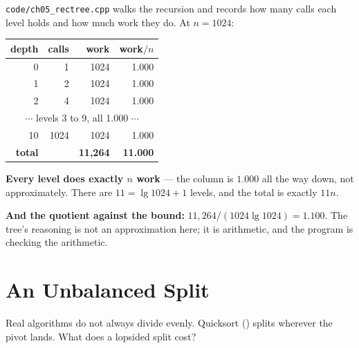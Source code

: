 \begin{worked}
\texttt{code/ch05\_rectree.cpp} walks the recursion and records how many calls
each level holds and how much work they do. At $n = 1024$:

\begin{center}
\begin{tabular}{@{}rrrr@{}}
\toprule
\rowcolor{primary!15}
depth & calls & work & work$/n$ \\
\midrule
0 &    1 & 1024 & 1.000 \\
1 &    2 & 1024 & 1.000 \\
2 &    4 & 1024 & 1.000 \\
\multicolumn{4}{c}{$\cdots$ levels 3 to 9, all 1.000 $\cdots$} \\
10 & 1024 & 1024 & 1.000 \\
\midrule
\textbf{total} & & \textbf{11{,}264} & \textbf{11.000} \\
\bottomrule
\end{tabular}
\end{center}

\smallskip
\textbf{Every level does exactly $n$ work} --- the column is $1.000$ all the
way down, not approximately. There are $11 = \lg 1024 + 1$ levels, and the
total is exactly $11n$.

\smallskip
\textbf{And the quotient against the bound:} $11{,}264 / (1024 \lg 1024) =
\mathbf{1.100}$. The tree's reasoning is not an approximation here; it is
arithmetic, and the program is checking the arithmetic.
\end{worked}

\section{An Unbalanced Split}

Real algorithms do not always divide evenly. Quicksort ()
splits wherever the pivot lands. What does a lopsided split cost?

